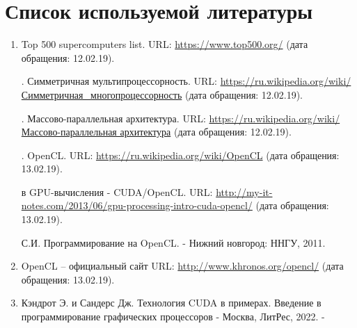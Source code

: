 { %
	\section*{Список используемой литературы}
	\begin{enumerate}
		\sloppy
		 В.В., Балакшин П.В. Введение в параллельные вычисления. – СПб: Университет ИТМО, 2016. – 51 с.
  
		\item Top 500 supercomputers list. URL: \href{https://www.top500.org/} {https://www.top500.org/} (дата обращения: 12.02.19).

        . Симметричная мультипроцессорность. URL: \href{https://ru.wikipedia.org/wiki/%D0%A1%D0%B8%D0%BC%D0%BC%D0%B5%D1%82%D1%80%D0%B8%D1%87%D0%BD%D0%B0%D1%8F_%D0%BC%D0%BD%D0%BE%D0%B3%D0%BE%D0%BF%D1%80%D0%BE%D1%86%D0%B5%D1%81%D1%81%D0%BE%D1%80%D0%BD%D0%BE%D1%81%D1%82%D1%8C}{https://ru.wikipedia.org/wiki/Симметричная\_многопроцессорность} (дата обращения: 12.02.19).
        
		. Массово-параллельная архитектура. URL: \href{https://ru.wikipedia.org/wiki/%D0%9C%D0%B0%D1%81%D1%81%D0%BE%D0%B2%D0%BE-%D0%BF%D0%B0%D1%80%D0%B0%D0%BB%D0%BB%D0%B5%D0%BB%D1%8C%D0%BD%D0%B0%D1%8F_%D0%B0%D1%80%D1%85%D0%B8%D1%82%D0%B5%D0%BA%D1%82%D1%83%D1%80%D0%B0}{https://ru.wikipedia.org/wiki/Массово-параллельная архитектура} (дата обращения: 12.02.19).
  
		. OpenCL. URL: \href{https://ru.wikipedia.org/wiki/OpenCL}{https://ru.wikipedia.org/wiki/OpenCL} (дата обращения: 13.02.19).
  
		 в GPU-вычисления - CUDA/OpenCL. URL: \href{http://my-it-notes.com/2013/06/gpu-processing-intro-cuda-opencl/}{http://my-it-notes.com/2013/06/gpu-processing-intro-cuda-opencl/} (дата обращения: 13.02.19).
		
         С.И. Программирование на OpenCL. - Нижний новгород: ННГУ, 2011.
		
        \item OpenCL – официальный сайт URL: \href{http://www.khronos.org/opencl/}{http://www.khronos.org/opencl/} (дата обращения: 13.02.19).
        
        \item Кэндрот Э. и Сандерс Дж. Технология CUDA в примерах. Введение в программирование графических процессоров - Москва, ЛитРес, 2022. - 
		

\end{enumerate}}

